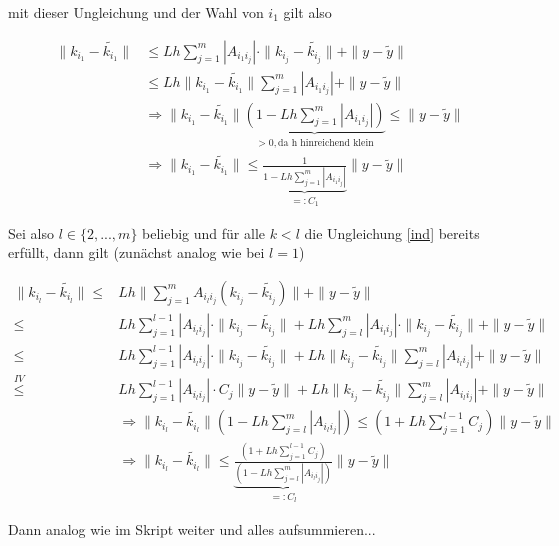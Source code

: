 \begin{solution}
mit dieser Ungleichung und der Wahl von $i_{1}$ gilt also

\begin{align*}
  \|k_{i_{1}}-\tilde{k_{i_{1}}}\| &\leq Lh \sum_{j=1}^{m}|A_{i_{1}i_{j}}|\cdot\|k_{i_{j}}-\tilde{k_{i_{j}}}\| + \|y-\tilde{y}\| \\
  &\leq Lh \|k_{i_{1}}-\tilde{k_{i_{1}}}\|\sum_{j=1}^{m}|A_{i_{1}i_{j}}| + \|y-\tilde{y}\| \\
  &\Rightarrow  \|k_{i_{1}}-\tilde{k_{i_{1}}}\| \underbrace{(1-Lh\sum_{j=1}^{m}|A_{i_{1}i_{j}}|)}_{>0, \text{da h hinreichend klein}} \leq \|y-\tilde{y}\| \\
  &\Rightarrow  \|k_{i_{1}}-\tilde{k_{i_{1}}}\|  \leq \underbrace{\frac{1}{1-Lh\sum_{j=1}^{m}|A_{i_{1}i_{j}}|}}_{=:C_{1}} \|y-\tilde{y}\|
\end{align*}

Sei also $l \in \{2,...,m\}$ beliebig und für alle $k<l$ die Ungleichung \eqref{ind} bereits erfüllt, dann gilt (zunächst analog wie bei $l=1$)

\begin{align*}
  \|k_{i_{l}}-\tilde{k_{i_{l}}}\| \leq& Lh \|\sum_{j=1}^{m}A_{i_{l}i_{j}}(k_{i_{j}}-\tilde{k_{i_{j}}})\| + \|y-\tilde{y}\| \\
  \leq& Lh\sum_{j=1}^{l-1}|A_{i_{l}i_{j}}|\cdot\|k_{i_{j}}-\tilde{k_{i_{j}}}\| + Lh\sum_{j=l}^{m}|A_{i_{l}i_{j}}|\cdot\|k_{i_{j}}-\tilde{k_{i_{j}}}\| + \|y-\tilde{y}\| \\
  \stackrel{}{\leq}& Lh\sum_{j=1}^{l-1}|A_{i_{l}i_{j}}|\cdot\|k_{i_{j}}-\tilde{k_{i_{j}}}\| + Lh\|k_{i_{j}}-\tilde{k_{i_{j}}}\|\sum_{j=l}^{m}|A_{i_{l}i_{j}}|+ \|y-\tilde{y}\| \\
  \stackrel{IV}{\leq}& Lh\sum_{j=1}^{l-1}|A_{i_{l}i_{j}}|\cdot C_{j} \|y-\tilde{y}\| + Lh\|k_{i_{j}}-\tilde{k_{i_{j}}}\|\sum_{j=l}^{m}|A_{i_{l}i_{j}}|+ \|y-\tilde{y}\| \\
  &\Rightarrow  \|k_{i_{l}}-\tilde{k_{i_{l}}}\| (1-Lh\sum_{j=l}^{m}|A_{i_{l}i_{j}}|) \leq (1+Lh\sum_{j=1}^{l-1}C_{j}) \|y-\tilde{y}\| \\
  &\Rightarrow  \|k_{i_{l}}-\tilde{k_{i_{l}}}\|  \leq \underbrace{\frac{(1+Lh\sum_{j=1}^{l-1}C_{j})}{(1-Lh\sum_{j=l}^{m}|A_{i_{l}i_{j}}|)}}_{=:C_{l}} \|y-\tilde{y}\|
\end{align*}

Dann analog wie im Skript weiter und alles aufsummieren...
\end{solution}
